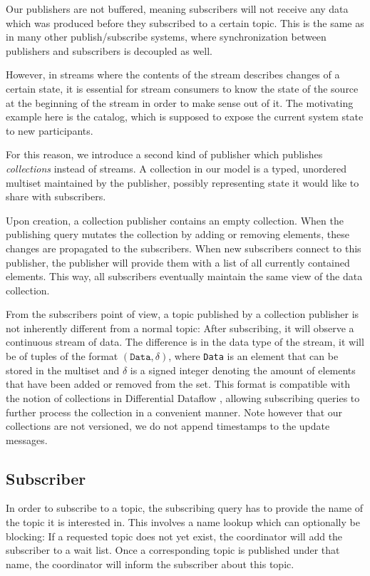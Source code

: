 Our publishers are not buffered, meaning subscribers will
not receive any data which was produced before they subscribed to a certain
topic. This is the same as in many other publish/subscribe systems, where
synchronization between publishers and subscribers is decoupled as well. \cite{pubsub}

However, in streams where the contents of the stream describes changes of a certain
state, it is essential for stream consumers to know the state of the source at
the beginning of the stream in order to make sense out of it. The motivating
example here is the catalog, which is supposed to expose the current system state to
new participants.

For this reason, we introduce a second kind of publisher which publishes
\emph{collections} instead of streams. A collection in our model is a typed, unordered
multiset maintained by the publisher, possibly representing state it would
like to share with subscribers.

Upon creation, a collection publisher contains an empty collection.
When the publishing query mutates the collection by adding or removing elements,
these changes are propagated to the subscribers. When new subscribers connect
to this publisher, the publisher will provide them with a list of all currently
contained elements. This way, all subscribers eventually maintain the same view
of the data collection.

From the subscribers point of view, a topic published by a collection publisher
is not inherently different from a normal topic: After subscribing, it will
observe a continuous stream of data. The difference is in the data type of the
stream, it will be of tuples of the format $(\texttt{Data}, \delta)$, where
\texttt{Data} is an element that can be stored in the multiset and $\delta$ 
is a signed integer denoting the amount of elements that have been added or removed from the set.
This format is compatible with the notion of collections in Differential Dataflow \cite{differential},
allowing subscribing queries to further process the collection in a convenient
manner. Note however that our collections are not versioned, we
do not append timestamps to the update messages.

\subsection{Subscriber}

In order to subscribe to a topic, the subscribing query has to provide the name
of the topic it is interested in. This involves a name lookup which can optionally
be blocking: If a requested topic does not yet exist, the coordinator will add
the subscriber to a wait list. Once a corresponding topic is published under that
name, the coordinator will inform the subscriber about this topic. 

